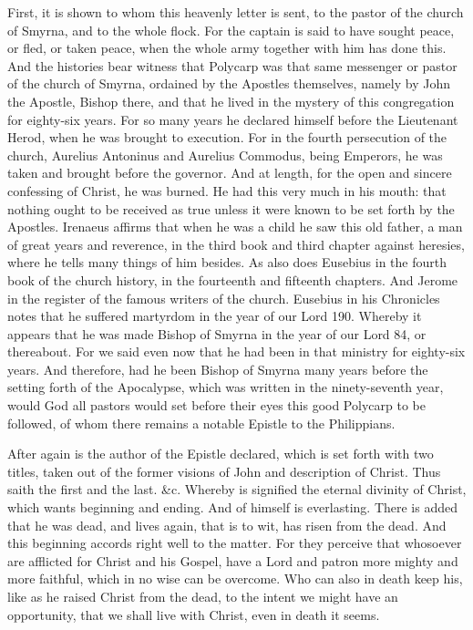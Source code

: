 First, it is shown to whom this heavenly letter is sent, to the pastor of the church of Smyrna, and to the whole flock. For the captain is said to have sought peace, or fled, or taken peace, when the whole army together with him has done this. And the histories bear witness that Polycarp was that same messenger or pastor of the church of Smyrna, ordained by the Apostles themselves, namely by John the Apostle, Bishop there, and that he lived in the mystery of this congregation for eighty-six years. For so many years he declared himself before the Lieutenant Herod, when he was brought to execution. For in the fourth persecution of the church, Aurelius Antoninus and Aurelius Commodus, being Emperors, he was taken and brought before the governor. And at length, for the open and sincere confessing of Christ, he was burned. He had this very much in his mouth: that nothing ought to be received as true unless it were known to be set forth by the Apostles. Irenaeus affirms that when he was a child he saw this old father, a man of great years and reverence, in the third book and third chapter against heresies, where he tells many things of him besides. As also does Eusebius in the fourth book of the church history, in the fourteenth and fifteenth chapters. And Jerome in the register of the famous writers of the church. Eusebius in his Chronicles notes that he suffered martyrdom in the year of our Lord 190. Whereby it appears that he was made Bishop of Smyrna in the year of our Lord 84, or thereabout. For we said even now that he had been in that ministry for eighty-six years. And therefore, had he been Bishop of Smyrna many years before the setting forth of the Apocalypse, which was written in the ninety-seventh year, would God all pastors would set before their eyes this good Polycarp to be followed, of whom there remains a notable Epistle to the Philippians.

After again is the author of the Epistle declared, which is set forth with two titles, taken out of the former visions of John and description of Christ. Thus saith the first and the last. \&c. Whereby is signified the eternal divinity of Christ, which wants beginning and ending. And of himself is everlasting. There is added that he was dead, and lives again, that is to wit, has risen from the dead. And this beginning accords right well to the matter. For they perceive that whosoever are afflicted for Christ and his Gospel, have a Lord and patron more mighty and more faithful, which in no wise can be overcome. Who can also in death keep his, like as he raised Christ from the dead, to the intent we might have an opportunity, that we shall live with Christ, even in death it seems.

